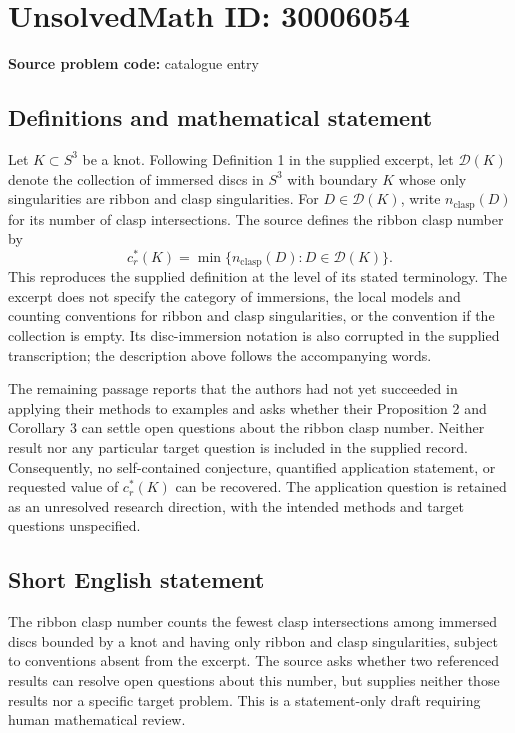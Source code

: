 \documentclass[11pt]{article}
\begin{document}
\section*{UnsolvedMath ID: 30006054}
\textbf{Source problem code:} catalogue entry
\subsection{Definitions and mathematical statement}
Let \(K\subset S^{3}\) be a knot. Following Definition 1 in the supplied excerpt, let \(\mathcal{D}(K)\) denote the collection of immersed discs in \(S^{3}\) with boundary \(K\) whose only singularities are ribbon and clasp singularities. For \(D\in\mathcal{D}(K)\), write \(n_{\mathrm{clasp}}(D)\) for its number of clasp intersections. The source defines the ribbon clasp number by
\[
c_r^{*}(K)=\min\bigl\{n_{\mathrm{clasp}}(D):D\in\mathcal{D}(K)\bigr\}.
\]
This reproduces the supplied definition at the level of its stated terminology. The excerpt does not specify the category of immersions, the local models and counting conventions for ribbon and clasp singularities, or the convention if the collection is empty. Its disc-immersion notation is also corrupted in the supplied transcription; the description above follows the accompanying words.

The remaining passage reports that the authors had not yet succeeded in applying their methods to examples and asks whether their Proposition 2 and Corollary 3 can settle open questions about the ribbon clasp number. Neither result nor any particular target question is included in the supplied record. Consequently, no self-contained conjecture, quantified application statement, or requested value of \(c_r^{*}(K)\) can be recovered. The application question is retained as an unresolved research direction, with the intended methods and target questions unspecified.
\subsection{Short English statement}
The ribbon clasp number counts the fewest clasp intersections among immersed discs bounded by a knot and having only ribbon and clasp singularities, subject to conventions absent from the excerpt. The source asks whether two referenced results can resolve open questions about this number, but supplies neither those results nor a specific target problem. This is a statement-only draft requiring human mathematical review.
\end{document}
